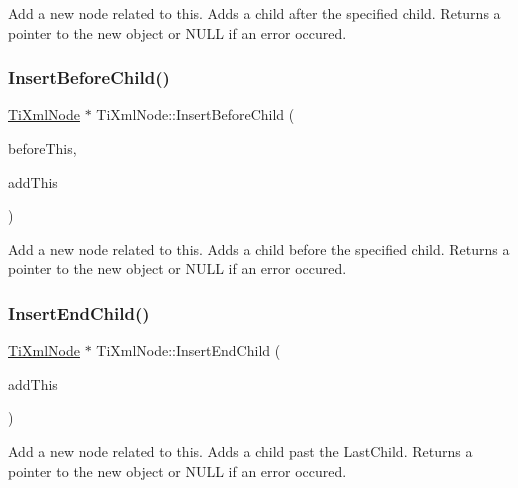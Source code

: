 Add a new node related to this. Adds a child after the specified child. Returns a pointer to the new object or N\+U\+LL if an error occured. \hypertarget{class_ti_xml_node_a71e54e393336382bc9875f64aab5cb15}{}\label{class_ti_xml_node_a71e54e393336382bc9875f64aab5cb15} 
\subsubsection{\texorpdfstring{Insert\+Before\+Child()}{InsertBeforeChild()}}
{\footnotesize\ttfamily \hyperlink{class_ti_xml_node}{Ti\+Xml\+Node} $\ast$ Ti\+Xml\+Node\+::\+Insert\+Before\+Child (\begin{DoxyParamCaption}\item[{\hyperlink{class_ti_xml_node}{Ti\+Xml\+Node} $\ast$}]{before\+This,  }\item[{const \hyperlink{class_ti_xml_node}{Ti\+Xml\+Node} \&}]{add\+This }\end{DoxyParamCaption})}

Add a new node related to this. Adds a child before the specified child. Returns a pointer to the new object or N\+U\+LL if an error occured. \hypertarget{class_ti_xml_node_af287a913ce46d8dbf7ef24fec69bbaf0}{}\label{class_ti_xml_node_af287a913ce46d8dbf7ef24fec69bbaf0} 
\subsubsection{\texorpdfstring{Insert\+End\+Child()}{InsertEndChild()}}
{\footnotesize\ttfamily \hyperlink{class_ti_xml_node}{Ti\+Xml\+Node} $\ast$ Ti\+Xml\+Node\+::\+Insert\+End\+Child (\begin{DoxyParamCaption}\item[{const \hyperlink{class_ti_xml_node}{Ti\+Xml\+Node} \&}]{add\+This }\end{DoxyParamCaption})}

Add a new node related to this. Adds a child past the Last\+Child. Returns a pointer to the new object or N\+U\+LL if an error occured. \hypertarget{class_ti_xml_node_a67c3a02b797f08d9a31b2553661257e1}{}\label{class_ti_xml_node_a67c3a02b797f08d9a31b2553661257e1} 
